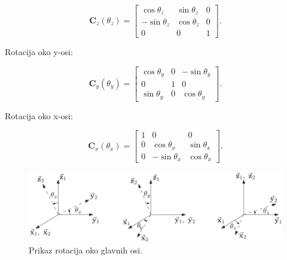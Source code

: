 \documentclass[times, utf8, diplomski, numeric]{templates/template}
\begin{document}
{{{{                \begin{equation}
                \label{eq:principal_rot_z}
                \textbf{C}_{z}(\theta_{z}) = 
                \begin{bmatrix}
                    \cos\theta_{z}   & \sin\theta_{z}    &  0 \\
                    -\sin\theta_{z}  & \cos\theta_{z}    &  0 \\
                    0                & 0                 &  1
                \end{bmatrix}
                .
                \end{equation}

                Rotacija oko y-osi:

                \begin{equation}
                \label{eq:principal_rot_y}
                \textbf{C}_{y}(\theta_{y}) = 
                \begin{bmatrix}
                    \cos\theta_{y}   &    0    &  -\sin\theta_{y} \\
                    0                &    1    &  0               \\
                    \sin\theta_{y}   &    0    &  \cos\theta_{y}
                \end{bmatrix}
                .
                \end{equation}

                Rotacija oko x-osi:

                \begin{equation}
                \label{eq:principal_rot_x}
                \textbf{C}_{x}(\theta_{x}) = 
                \begin{bmatrix}
                    1    &      0           &  0 \\
                    0    & \cos\theta_{x}   &  \sin\theta_{x} \\
                    0    & -\sin\theta_{x}  &  \cos\theta_{x}
                \end{bmatrix}
                .
                \end{equation}

                \begin{figure}[htb]
                \centering
                \includegraphics[width=1.0\textwidth]{images/principal_rotations.png}
                \caption{Prikaz rotacija oko glavnih osi.}
                \label{fig:principal_rotations}
                \end{figure}
            }

}}}
\end{document}
